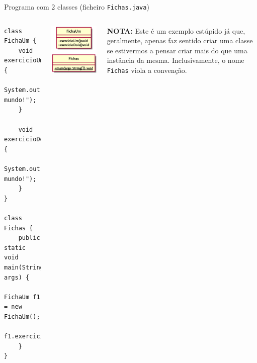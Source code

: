 \documentclass[portuguese, aspectratio=169, xcolor=table]{beamer}
\begin{document}
\begin{frame}[fragile]{Programa com 2 classes (ficheiro \texttt{Fichas.java})}
\begin{columns}
\begin{verbatim}
class FichaUm {
    void exercicioUm() {
        System.out.println("Olá mundo!");
    }
    
    void exercicioDois() {
        System.out.println("Adeus mundo!");
    }
}

class Fichas {
    public static void main(String[] args) {
        FichaUm f1 = new FichaUm();
        f1.exercicioUm();
    }
}
\end{verbatim}
\begin{center}
    \includegraphics[width=0.5\linewidth]{./uml_diagrams/class2}
\end{center}
\vspace{0.5cm}
\tiny \textbf{NOTA:} Este é um exemplo estúpido já que, geralmente, apenas faz sentido criar uma classe se estivermos a pensar criar mais do que uma instância da mesma. Inclusivamente, o nome \texttt{Fichas} viola a convenção.
\end{columns}

\end{frame}
  
\end{document}
